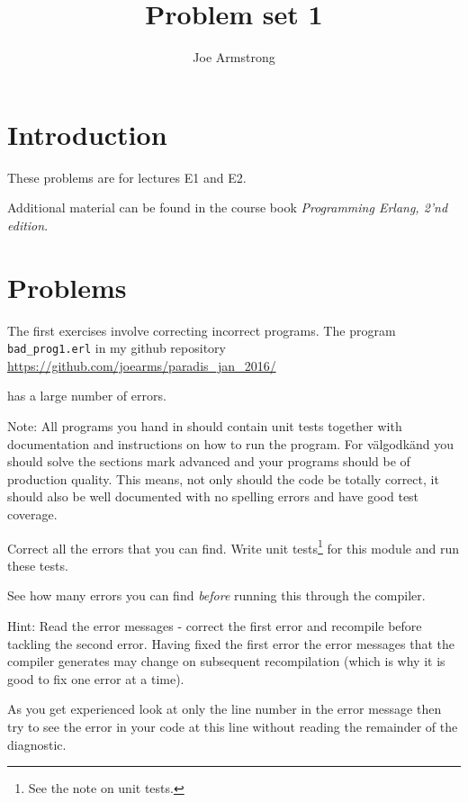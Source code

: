 \documentclass[12pt]{hitec}
\title{Problem set 1}
\author{Joe Armstrong}
\date{}
\begin{document}
\maketitle

\tableofcontents

\section{Introduction}
These problems are for lectures E1 and E2.

Additional material can be found in the course book
{\sl Programming Erlang, 2'nd edition}.

\section{Problems}

The first exercises involve correcting
incorrect programs. The program \verb+bad_prog1.erl+ in my github repository
\newline
\href{https://github.com/joearms/paradis\_jan\_2016/blob/master/lectures/bad\_prog1.erl}
     {https://github.com/joearms/paradis\_jan\_2016/}

has a 
large number of errors.

Note: All programs you hand in should contain unit tests together with
documentation and instructions on how to run the program. For
v\"{a}lgodk\"{a}nd you should solve the sections mark advanced and
your programs should be of production quality. This means, not only
should the code be totally correct, it should also be well documented
with no spelling errors and have good test coverage.


Correct all the errors that you can find.  Write unit
tests\footnote{See the note on unit tests.}  for this module and run
these tests.

See how many errors you can find {\sl before} running this through the
compiler.

Hint: Read the error messages - correct the first error and recompile
before tackling the second error. Having fixed the first error the
error messages that the compiler generates may change on subsequent
recompilation (which is why it is good to fix one error at a time).

As you get experienced look at only the line number in the error
message then try to see the error in your code at this line without
reading the remainder of the diagnostic.
\end{document}
